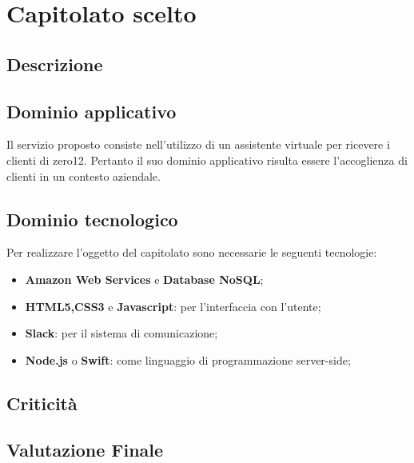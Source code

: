 \section {Capitolato scelto}
	\subsection {Descrizione}
		\SCOPO
	\subsection {Dominio applicativo}
Il servizio proposto consiste nell'utilizzo di un assistente virtuale per ricevere i clienti di zero12. Pertanto il suo dominio applicativo risulta essere l'accoglienza di clienti in un contesto aziendale.
	\subsection {Dominio tecnologico}
		Per realizzare l'oggetto del capitolato sono necessarie le seguenti tecnologie:
		\begin {itemize}
			\item \textbf{Amazon Web Services} e \textbf{Database NoSQL};
			\item \textbf{HTML5,CSS3} e \textbf{Javascript}: per l'interfaccia con l'utente;
			\item \textbf{Slack}: per il sistema di comunicazione;
			\item \textbf{Node.js} o \textbf{Swift}: come linguaggio di programmazione server-side;

		\end {itemize}
	\subsection {Criticità}
	\subsection {Valutazione Finale}